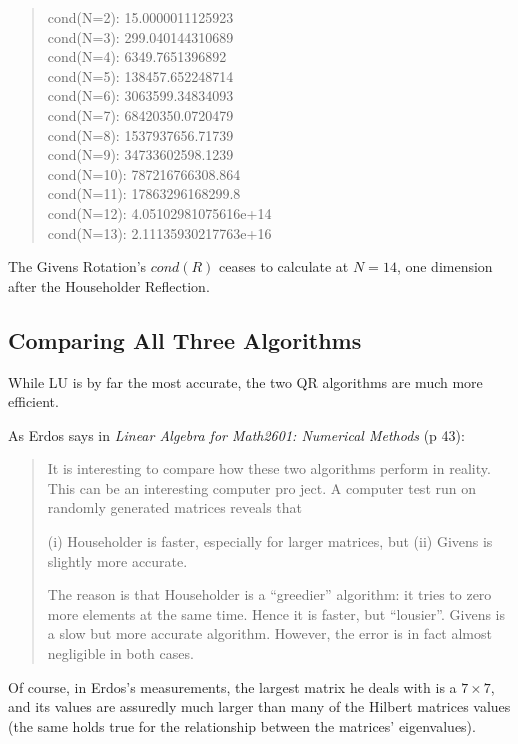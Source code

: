 \documentclass[letterpaper,12pt]{article}
\begin{document}
\begin{quote}
cond(N=2):  15.0000011125923
\\cond(N=3):  299.040144310689
\\cond(N=4):  6349.7651396892
\\cond(N=5):  138457.652248714
\\cond(N=6):  3063599.34834093
\\cond(N=7):  68420350.0720479
\\cond(N=8):  1537937656.71739
\\cond(N=9):  34733602598.1239
\\cond(N=10): 787216766308.864
\\cond(N=11): 17863296168299.8
\\cond(N=12): 4.05102981075616e+14
\\cond(N=13): 2.11135930217763e+16
\end{quote}

The Givens Rotation's $cond(R)$ ceases to calculate at $N=14$,
one dimension after the Householder Reflection.

\subsection{Comparing All Three Algorithms}

While LU is by far the most accurate, the two QR algorithms are much more
efficient.

As Erdos says in \textit{Linear Algebra for Math2601: Numerical Methods} (p 43):

\begin{quote}
It is interesting to compare how these two algorithms perform in reality. This can be an
interesting computer pro ject. A computer test run on randomly generated matrices reveals
that

\indent (i) Householder is faster, especially for larger matrices, but
\indent (ii) Givens is slightly more accurate.

The reason is that Householder is a “greedier” algorithm: it tries to zero more elements at
the same time. Hence it is faster, but “lousier”. Givens is a slow but more accurate algorithm.
However, the error is in fact almost negligible in both cases.
\end{quote}

Of course, in Erdos's measurements, the largest matrix he deals with is a $7 \times 7$, and its
values are assuredly much larger than many of the Hilbert matrices values (the same holds true
for the relationship between the matrices' eigenvalues).
\end{document}
